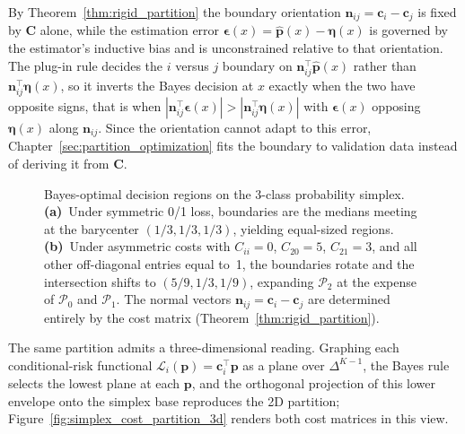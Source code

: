 By Theorem~\ref{thm:rigid_partition} the boundary orientation $\mathbf{n}_{ij} = \mathbf{c}_i - \mathbf{c}_j$ is fixed by $\mathbf{C}$ alone, while the estimation error $\boldsymbol{\epsilon}(x) = \hat{\mathbf{p}}(x) - \boldsymbol{\eta}(x)$ is governed by the estimator's inductive bias and is unconstrained relative to that orientation. The plug-in rule decides the $i$ versus $j$ boundary on $\mathbf{n}_{ij}^\top \hat{\mathbf{p}}(x)$ rather than $\mathbf{n}_{ij}^\top \boldsymbol{\eta}(x)$, so it inverts the Bayes decision at $x$ exactly when the two have opposite signs, that is when $|\mathbf{n}_{ij}^\top \boldsymbol{\epsilon}(x)| > |\mathbf{n}_{ij}^\top \boldsymbol{\eta}(x)|$ with $\boldsymbol{\epsilon}(x)$ opposing $\boldsymbol{\eta}(x)$ along $\mathbf{n}_{ij}$. Since the orientation cannot adapt to this error, Chapter~\ref{sec:partition_optimization} fits the boundary to validation data instead of deriving it from $\mathbf{C}$.

\begin{figure}[H]
    \centering
    \resizebox{0.8\textwidth}{!}{}
    \caption{Bayes-optimal decision regions on the 3-class probability simplex. \textbf{(a)}~Under symmetric 0/1 loss, boundaries are the medians meeting at the barycenter $(1/3, 1/3, 1/3)$, yielding equal-sized regions. \textbf{(b)}~Under asymmetric costs with $C_{ii}=0$, $C_{20}=5$, $C_{21}=3$, and all other off-diagonal entries equal to~1, the boundaries rotate and the intersection shifts to $(5/9, 1/3, 1/9)$, expanding $\mathcal{P}_2$ at the expense of $\mathcal{P}_0$ and $\mathcal{P}_1$. The normal vectors $\mathbf{n}_{ij} = \mathbf{c}_i - \mathbf{c}_j$ are determined entirely by the cost matrix (Theorem~\ref{thm:rigid_partition}).}\label{fig:simplex_cost_partition}
\end{figure}

The same partition admits a three-dimensional reading. Graphing each conditional-risk functional $\mathcal{L}_i(\mathbf{p}) = \mathbf{c}_i^\top \mathbf{p}$ as a plane over $\Delta^{K-1}$, the Bayes rule selects the lowest plane at each $\mathbf{p}$, and the orthogonal projection of this lower envelope onto the simplex base reproduces the 2D partition; Figure~\ref{fig:simplex_cost_partition_3d} renders both cost matrices in this view.

